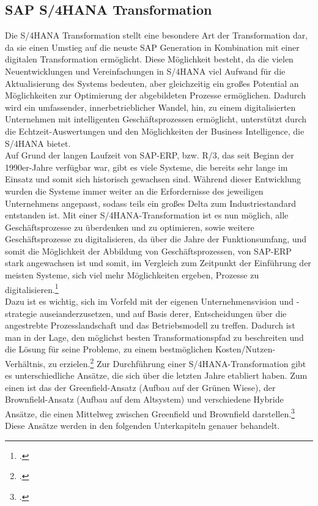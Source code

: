 \subsection{SAP S/4HANA Transformation}
\label{kap:s4hanatrans}
Die S/4HANA Transformation stellt eine besondere Art der Transformation dar, da sie einen Umstieg auf die neuste SAP Generation in Kombination mit einer digitalen Transformation ermöglicht. Diese Möglichkeit besteht, da die vielen Neuentwicklungen und Vereinfachungen in S/4HANA viel Aufwand für die Aktualisierung des Systems bedeuten, aber gleichzeitig ein großes Potential an Möglichkeiten zur Optimierung der abgebildeten Prozesse ermöglichen. Dadurch wird ein umfassender, innerbetrieblicher Wandel, hin, zu einem digitalisierten Unternehmen mit intelligenten Geschäftsprozessen ermöglicht, unterstützt durch die Echtzeit-Auswertungen und den Möglichkeiten der Business Intelligence, die S/4HANA bietet.
\\Auf Grund der langen Laufzeit von SAP-ERP, bzw. R/3, das seit Beginn der 1990er-Jahre verfügbar war, gibt es viele Systeme, die bereits sehr lange im Einsatz und somit sich historisch gewachsen sind. Während dieser Entwicklung wurden die Systeme immer weiter an die Erfordernisse des jeweiligen Unternehmens angepasst, sodass teils ein großes Delta zum Industriestandard entstanden ist. Mit einer S/4HANA-Transformation ist es nun möglich, alle Geschäftsprozesse zu überdenken und zu optimieren, sowie weitere Geschäftsprozesse zu digitalisieren, da über die Jahre der Funktionsumfang, und somit die Möglichkeit der Abbildung von Geschäftsprozessen, von SAP-ERP stark angewachsen ist und somit, im Vergleich zum Zeitpunkt der Einführung der meisten Systeme, sich viel mehr Möglichkeiten ergeben, Prozesse zu digitalisieren.\footcite[Vgl.][]{s4-interview}
\\Dazu ist es wichtig, sich im Vorfeld mit der eigenen Unternehmensvision und -strategie auseianderzusetzen, und auf Basis derer, Entscheidungen über die angestrebte Prozesslandschaft und das Betriebsmodell zu treffen. Dadurch ist man in der Lage, den möglichst besten Transformationspfad zu beschreiten und die Lösung für seine Probleme, zu einem bestmöglichen Kosten/Nutzen-Verhältnis, zu erzielen.\footcite[Vgl.][]{ao-blog}
Zur Durchführung einer S/4HANA-Transformation gibt es unterschiedliche Ansätze, die sich über die letzten Jahre etabliert haben. Zum einen ist das der Greenfield-Ansatz (Aufbau auf der \glqq{}Grünen Wiese\grqq{}), der Brownfield-Ansatz (Aufbau auf dem Altsystem) und verschiedene Hybride Ansätze, die einen Mittelweg zwischen Greenfield und Brownfield darstellen.\footcite[Vgl.][]{ao-blog} Diese Ansätze werden in den folgenden Unterkapiteln genauer behandelt.

